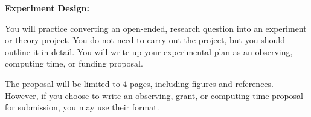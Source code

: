 \documentclass{article}
\begin{document}
\noindent \textbf{Experiment Design:}

You will practice converting an open-ended, research question into an 
experiment or theory project.
You do not need to carry out the project, but you should outline it in
detail.
You will write up your experimental plan as an observing, computing time,
or funding proposal.

The proposal will be limited to 4 pages, including figures and references.
However, if you choose to write an observing, grant, or computing time proposal
for submission, you may use their format.
\end{document}
